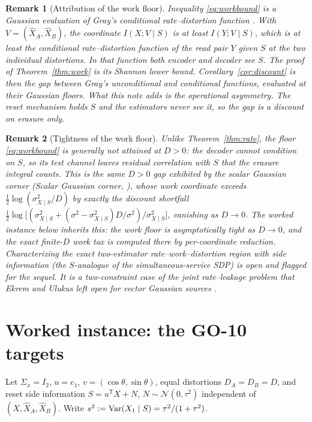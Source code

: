 \documentclass[11pt]{article}
\newtheorem{remark}{Remark}\newtheorem{definition}{Definition}
\newcommand{\hX}{\widehat X}\newcommand{\hY}{\widehat Y}
\begin{document}
\begin{remark}[Attribution of the work floor]\label{rem:grayfloor}
Inequality \eqref{eq:workbound} is a Gaussian evaluation of Gray's conditional
rate--distortion function \cite{gray1973}. With $V=(\hX_A,\hX_B)$, the
coordinate $I(X;V\mid S)$ is at least $I(Y;V\mid S)$, which is at least the
conditional rate--distortion function of the read pair $Y$ given $S$ at the
two individual distortions. In that function both encoder and decoder see $S$.
The proof of Theorem~\ref{thm:work} is its Shannon lower bound.
Corollary~\ref{cor:discount} is then the gap between Gray's unconditional and
conditional functions, evaluated at their Gaussian floors. What this note adds
is the operational asymmetry. The reset mechanism holds $S$ and the estimators
never see it, so the gap is a discount on erasure only.
\end{remark}

\begin{remark}[Tightness of the work floor]\label{rem:worktight}
Unlike Theorem~\ref{thm:rate}, the floor \eqref{eq:workbound} is generally
not attained at $D>0$: the decoder cannot condition on $S$, so its test
channel leaves residual correlation with $S$ that the erasure integral
counts. This is the same $D>0$ gap exhibited by the scalar Gaussian corner
(\emph{Scalar Gaussian corner}, \cite{bondlandauerV}), whose work coordinate
exceeds
$\tfrac12\log(\sigma^2_{X\mid S}/D)$ by exactly the discount shortfall
$\tfrac12\log\bigl[(\sigma^2_{X\mid S}+(\sigma^2-\sigma^2_{X\mid
S})D/\sigma^2)/\sigma^2_{X\mid S}\bigr]$, vanishing as $D\to0$. The worked
instance below inherits this: the work floor is asymptotically tight as
$D\to0$, and the \emph{exact} finite-$D$ work tax is computed there by
per-coordinate reduction. Characterizing the exact two-estimator
rate--work--distortion region with side information (the $S$-analogue of
the simultaneous-service SDP) is open and flagged for the sequel. It is a
two-constraint case of the joint rate--leakage problem that Ekrem and Ulukus
left open for vector Gaussian sources \cite{ekrem2013}.
\end{remark}

\section{Worked instance: the GO-10 targets}\label{sec:instance}
Let $\Sigma_x=I_2$, $u=e_1$, $v=(\cos\theta,\sin\theta)$, equal distortions
$D_A=D_B=D$, and reset side information $S=u^{\mathsf T}X+N$,
$N\sim\mathcal N(0,\tau^2)$ independent of $(X,\hX_A,\hX_B)$. Write
$s^2:=\operatorname{Var}(X_1\mid S)=\tau^2/(1+\tau^2)$.
\end{document}
